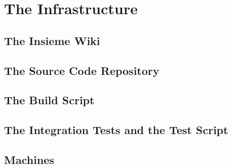 \chapter{The Infrastructure} \label{cap:infrastructure}

\section{The Insieme Wiki}
\section{The Source Code Repository}

\section{The Build Script} \label{sec:Infrastructure.Build}
\section{The Integration Tests and the Test Script}
\section{Machines}
